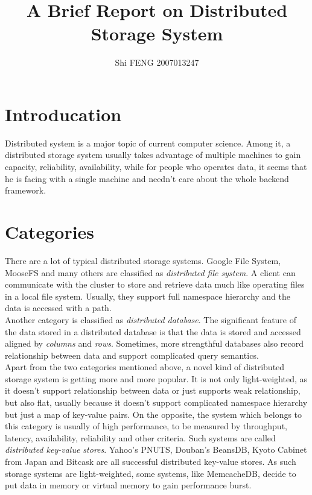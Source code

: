 \documentclass{article}
\title{A Brief Report on Distributed Storage System}
\author{Shi FENG 2007013247}
\begin{document}
\maketitle
\tableofcontents

\section{Introducation}
Distributed system is a major topic of current computer science. Among it, a
distributed storage system usually takes advantage of multiple machines to
gain capacity, reliability, availability, while for people who operates data,
it seems that he is facing with a single machine and needn't care about the
whole backend framework.

\section{Categories}
There are a lot of typical distributed storage systems. Google File
System\cite{ghemawat2003google}, MooseFS\cite{moosefs} and many others are
classified as \emph{distributed file system}. A client can communicate with
the cluster to store and retrieve data much like operating files in a local
file system. Usually, they support full namespace hierarchy and the data is
accessed with a path.\\

Another category is classified as \emph{distributed database}. The significant
feature of the data stored in a distributed database is that the data is
stored and accessed aligned by \emph{columns} and \emph{rows}. Sometimes, more
strengthful databases also record relationship between data and support
complicated query semantics.\\

Apart from the two categories mentioned above, a novel kind of distributed
storage system is getting more and more popular. It is not only light-weighted,
as it doesn't support relationship between data or just supports weak
relationship, but also flat, usually because it doesn't support complicated
namespace hierarchy but just a map of key-value pairs. On the opposite, the
system which belongs to this category is usually of high performance, to be
measured by throughput, latency, availability, reliability and other criteria.
Such systems are called \emph{distributed key-value stores}. Yahoo's
PNUTS\cite{cooper2008pnuts}, Douban's BeansDB\cite{beansdb}, Kyoto
Cabinet\cite{kyotocabinet} from Japan and Bitcask\cite{bitcask} are all
successful distributed key-value stores. As such storage systems are
light-weighted, some systems, like MemcacheDB\cite{memcachedb}, decide to put
data in memory or virtual memory to gain performance burst.\\
\end{document}
